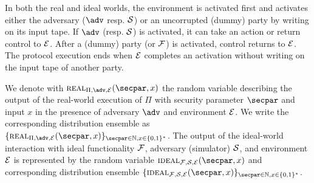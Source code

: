 In both the real and ideal worlds, the environment is activated first and activates either the adversary ($\adv$ resp. $\mathcal{S}$) or an uncorrupted (dummy) party by writing on its input tape. If $\adv$ (resp. $\mathcal{S}$) is activated, it can take an action or return control to $\mathcal{E}$. After a (dummy) party (or $\mathcal{F}$) is activated, control returns to $\mathcal{E}$. The protocol execution ends when $\mathcal{E}$ completes an activation without writing on the input tape of another party.

We denote with $\real_{\Pi,\adv,\env}(\secpar,x)$ the random variable describing the output of the real-world execution of $\Pi$ with security parameter $\secpar$ and input $x$ in the presence of adversary $\adv$ and environment $\mathcal{E}$. We write the corresponding distribution ensemble as $\{ \real_{\Pi,\adv,\env}(\secpar, x) \}_{\secpar \in \mathbb{N}, x \in \{0,1\}^*}$. The output of the ideal-world interaction with ideal functionality $\mathcal{F}$, adversary (simulator) $\mathcal{S}$, and environment $\mathcal{E}$ is represented by the random variable $\ideal_{\F,\Sim,\env}(\secpar, x)$ and corresponding distribution ensemble $\{ \ideal_{\F,\Sim,\env}(\secpar, x) \}_{\secpar \in \mathbb{N}, x \in \{0,1\}^*}$.

